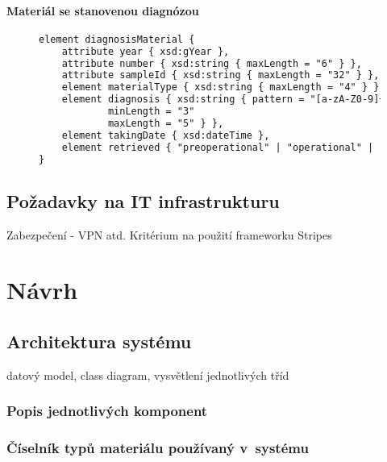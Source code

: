 \subsubsection{Materiál se stanovenou diagnózou}
\begin{figure}[hbtp]
\begin{center}
\begin{lstlisting}[language=XML, caption={Element popisující materiál se stanovenou diagnózou v~exportním schéma.}]
element diagnosisMaterial {
	attribute year { xsd:gYear },
	attribute number { xsd:string { maxLength = "6" } },
	attribute sampleId { xsd:string { maxLength = "32" } },
	element materialType { xsd:string { maxLength = "4" } }
	element diagnosis { xsd:string { pattern = "[a-zA-Z0-9]+" 
			minLength = "3" 
			maxLength = "5" } },
	element takingDate { xsd:dateTime },
	element retrieved { "preoperational" | "operational" | "post" | "unknown" }
}
\end{lstlisting}
\end{center}
\label{fig:export:data:diagnosisMaterial}
\end{figure}


\section{Požadavky na IT infrastrukturu}
Zabezpečení - VPN atd.
Kritérium na použití frameworku Stripes

\chapter{Návrh}

\section{Architektura systému}

datový model, class diagram, vysvětlení jednotlivých tříd

\subsection{Popis jednotlivých komponent}

\subsection{Číselník typů materiálu používaný v~systému}

